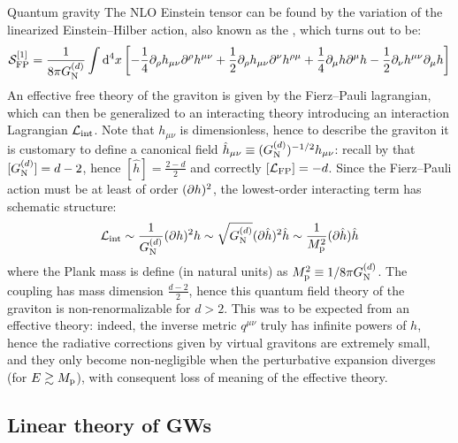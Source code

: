 \begin{observation}{Quantum gravity}{}
  The NLO Einstein tensor can be found by the variation of the linearized Einstein--Hilber action, also known as the , which turns out to be:
  \begin{equation}
    \mathcal{S}_\text{FP}^{[1]} = \frac{1}{8\pi G_\text{N}^{(d)}} \int \mathrm{d}^4 x \left[ - \frac{1}{4} \partial_\rho h_{\mu \nu} \partial^\rho h^{\mu \nu} + \frac{1}{2} \partial_\rho h_{\mu \nu} \partial^\nu h^{\rho \mu} + \frac{1}{4} \partial_\mu h \partial^\mu h - \frac{1}{2} \partial_\nu h^{\mu \nu} \partial_\mu h \right]
  \end{equation}
  An effective free theory of the graviton is given by the Fierz--Pauli lagrangian, which can then be generalized to an interacting theory introducing an interaction Lagrangian $ \mathcal{L}_\text{int} $. Note that $ h_{\mu \nu} $ is dimensionless, hence to describe the graviton it is customary to define a canonical field $ \hat{h}_{\mu \nu} \equiv (G_\text{N}^{(d)})^{-1/2} h_{\mu \nu} $: recall by  that $ [G_\text{N}^{(d)}] = d - 2 $, hence $ [\hat{h}] = \frac{2 - d}{2} $ and correctly $ [\mathcal{L}_\text{FP}] = -d $. Since the Fierz--Pauli action must be at least of order $ (\partial h)^2 $, the lowest-order interacting term has schematic structure:
  \begin{equation*}
    \mathcal{L}_\text{int} \sim \frac{1}{G_\text{N}^{(d)}} (\partial h)^2 h \sim \sqrt{G_\text{N}^{(d)}} (\partial \hat{h})^2 \hat{h} \sim \frac{1}{M_\text{p}^2} (\partial \hat{h}) \hat{h}
  \end{equation*}
  where the Plank mass is define (in natural units) as $ M_\text{p}^2 \equiv 1 / 8 \pi G_\text{N}^{(d)} $.
  The coupling has mass dimension $ \frac{d - 2}{2} $, hence this quantum field theory of the graviton is non-renormalizable for $ d > 2 $. This was to be expected from an effective theory: indeed, the inverse metric $ q^{\mu \nu} $ truly has infinite powers of $ h $, hence the radiative corrections given by virtual gravitons are extremely small, and they only become non-negligible when the perturbative expansion diverges (for $ E \gtrsim M_\text{p} $), with consequent loss of meaning of the effective theory.
\end{observation}

\subsection{Linear theory of GWs}

